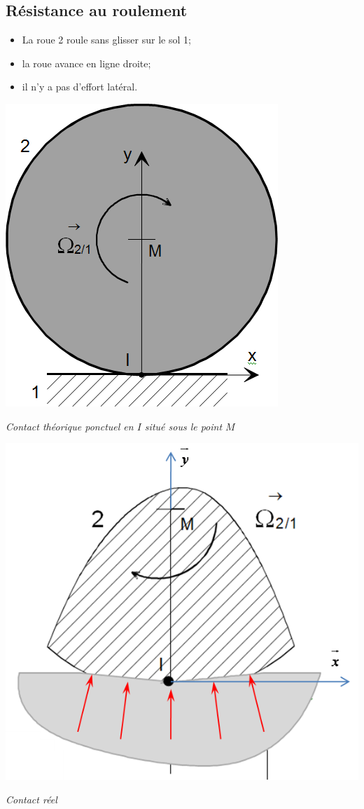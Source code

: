 \documentclass[10pt]{article}
\begin{document}
\subsection{Résistance au roulement}
\begin{hypo}
\begin{itemize}
\item La roue 2 roule sans glisser sur le sol 1;
\item la roue avance en ligne droite; 
\item il n'y a pas d'effort latéral. 
\end{itemize}
\end{hypo}

\begin{minipage}[c]{.45\linewidth}
\begin{center}
\includegraphics[width=.6\textwidth]{images/roule_01}

\textit{Contact théorique ponctuel en $I$ situé sous le point $M$}
\end{center}
\end{minipage} \hfill
\begin{minipage}[c]{.45\linewidth}
\begin{center}
\includegraphics[width=.6\textwidth]{images/roule_02}

\textit{Contact réel}
\end{center}
\end{minipage}
\end{document}
